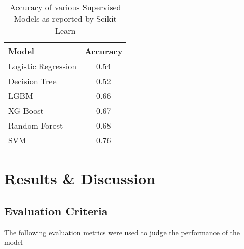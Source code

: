 \documentclass[conference]{IEEEtran}
\begin{document}
 


\begin{table}[h!]
	\centering
	
	\begin{tabular}{@{}lc@{}}
		\textbf{Model} & \multicolumn{1}{l}{\textbf{Accuracy}}           \\\midrule
		Logistic Regression               & 0.54                                                                              \\
		Decision Tree               & 0.52                        \\
		LGBM            & 0.66                       \\
		XG Boost              & 0.67                          \\
		Random Forest               & 0.68                         \\
		SVM              & 0.76                        \\
	\end{tabular}
	\vspace{0.1in}
	\caption{Accuracy of various Supervised Models as reported by Scikit Learn \cite{scikit}}
	\label{tab:avsm}
\end{table}





\section{Results \& Discussion}
\label{result}
\subsection{Evaluation Criteria}

The following evaluation metrics were used to judge the performance of the model
\end{document}
